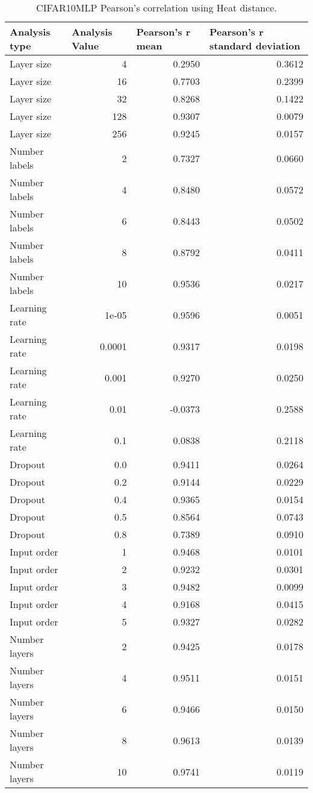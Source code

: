\documentclass{article}
\begin{document}
\begin{table}[H]
\centering
\begin{tabular}{@{}lrrr@{}}
\toprule
Analysis type & \multicolumn{1}{l}{Analysis Value} & \multicolumn{1}{l}{Pearson's r mean} & \multicolumn{1}{l}{Pearson's r standard deviation} \\ \midrule
Layer size & 4 & 0.2950 & 0.3612 \\ 
Layer size & 16 & 0.7703 & 0.2399 \\ 
Layer size & 32 & 0.8268 & 0.1422 \\ 
Layer size & 128 & 0.9307 & 0.0079 \\ 
Layer size & 256 & 0.9245 & 0.0157 \\ 
Number labels & 2 & 0.7327 & 0.0660 \\ 
Number labels & 4 & 0.8480 & 0.0572 \\ 
Number labels & 6 & 0.8443 & 0.0502 \\ 
Number labels & 8 & 0.8792 & 0.0411 \\ 
Number labels & 10 & 0.9536 & 0.0217 \\ 
Learning rate & 1e-05 & 0.9596 & 0.0051 \\ 
Learning rate & 0.0001 & 0.9317 & 0.0198 \\ 
Learning rate & 0.001 & 0.9270 & 0.0250 \\ 
Learning rate & 0.01 & -0.0373 & 0.2588 \\ 
Learning rate & 0.1 & 0.0838 & 0.2118 \\ 
Dropout & 0.0 & 0.9411 & 0.0264 \\ 
Dropout & 0.2 & 0.9144 & 0.0229 \\ 
Dropout & 0.4 & 0.9365 & 0.0154 \\ 
Dropout & 0.5 & 0.8564 & 0.0743 \\ 
Dropout & 0.8 & 0.7389 & 0.0910 \\ 
Input order & 1 & 0.9468 & 0.0101 \\ 
Input order & 2 & 0.9232 & 0.0301 \\ 
Input order & 3 & 0.9482 & 0.0099 \\ 
Input order & 4 & 0.9168 & 0.0415 \\ 
Input order & 5 & 0.9327 & 0.0282 \\ 
Number layers & 2 & 0.9425 & 0.0178 \\ 
Number layers & 4 & 0.9511 & 0.0151 \\ 
Number layers & 6 & 0.9466 & 0.0150 \\ 
Number layers & 8 & 0.9613 & 0.0139 \\ 
Number layers & 10 & 0.9741 & 0.0119 \\ 
\bottomrule
\end{tabular}
\caption{CIFAR10MLP Pearson's correlation using Heat distance.}
\end{table}
\end{document}
